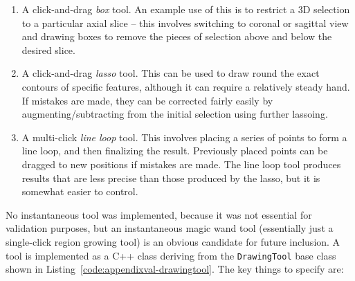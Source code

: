 \begin{enumerate}

\item A click-and-drag \emph{box} tool. An example use of this is to restrict a 3D selection to a particular axial slice -- this involves switching to coronal or sagittal view and drawing boxes to remove the pieces of selection above and below the desired slice.

\item A click-and-drag \emph{lasso} tool. This can be used to draw round the exact contours of specific features, although it can require a relatively steady hand. If mistakes are made, they can be corrected fairly easily by augmenting/subtracting from the initial selection using further lassoing.

\item A multi-click \emph{line loop} tool. This involves placing a series of points to form a line loop, and then finalizing the result. Previously placed points can be dragged to new positions if mistakes are made. The line loop tool produces results that are less precise than those produced by the lasso, but it is somewhat easier to control.

\end{enumerate}
%
No instantaneous tool was implemented, because it was not essential for validation purposes, but an instantaneous magic wand tool (essentially just a single-click region growing tool) is an obvious candidate for future inclusion. A tool is implemented as a C++ class deriving from the \texttt{DrawingTool} base class shown in Listing~\ref{code:appendixval-drawingtool}. The key things to specify are:

